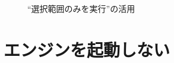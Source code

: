 \documentclass{jbook}
\begin{document}
\begin{figure}[tb]
\caption{``選択範囲のみを実行''の活用} \label{fig:howtoDebug1}
\end{figure}


\section{エンジンを起動しない}
\end{document}
